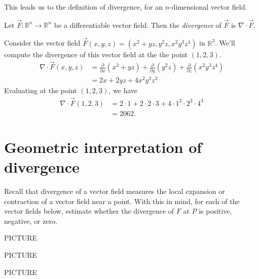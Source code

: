 \documentclass{ximera}
\begin{document}
This leads us to the definition of divergence, for an $n$-dimensional vector field.

\begin{definition}
Let $\vec{F}:\mathbb{R}^n\rightarrow\mathbb{R}^n$ be a differentiable vector field. Then the \emph{divergence} of $\vec{F}$ is $\nabla\cdot \vec{F}$.
\end{definition}

\begin{example}
Consider the vector field $\vec{F}(x,y,z) = (x^2+yz, y^2z, x^2y^3z^4)$ in $\mathbb{R}^3$. We'll compute the divergence of this vector field at the the point $(1,2,3)$.
\begin{align*}
\nabla\cdot \vec{F}(x,y,z) &= \frac{\partial}{\partial x}(x^2+yz) + \frac{\partial}{\partial y}(y^2z) + \frac{\partial}{\partial z}(x^2y^3z^4)\\
&= 2x + 2yz + 4x^2y^3z^3
\end{align*}
Evaluating at the point $(1,2,3)$, we have
\begin{align*}
\nabla\cdot \vec{F}(1,2,3) &= 2\cdot 1 + 2\cdot 2\cdot 3 + 4\cdot 1^2\cdot 2^3\cdot 4^3\\
&= 2062.
\end{align*}
\end{example}

\section*{Geometric interpretation of divergence}

Recall that divergence of a vector field measures the local expansion or contraction of a vector field near a point. With this in mind, for each of the vector fields below, estimate whether the divergence of $F$ at $P$ is positive, negative, or zero.

\begin{example}
PICTURE

\begin{multipleChoice}
\end{multipleChoice}
\end{example}

\begin{example}
PICTURE

\begin{multipleChoice}
\end{multipleChoice}
\end{example}

\begin{example}
PICTURE

\begin{multipleChoice}
\end{multipleChoice}
\end{example}
\end{document}
